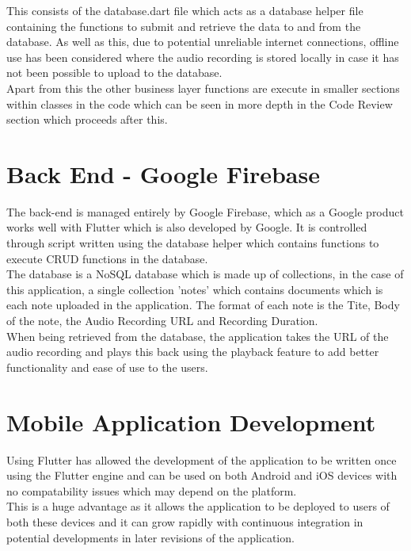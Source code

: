 \documentclass[oneside]{report}
\begin{document}
	This consists of the database.dart file which acts as a database helper file containing the functions to submit and retrieve the data to and from the database. As well as this, due to potential unreliable internet connections, offline use has been considered where the audio recording is stored locally in case it has not been possible to upload to the database. \\
	
	Apart from this the other business layer functions are execute in smaller sections within classes in the code which can be seen in more depth in the Code Review section which proceeds after this.

	\section{Back End - Google Firebase}
	The back-end is managed entirely by Google Firebase, which as a Google product works well with Flutter which is also developed by Google. It is controlled through script written using the database helper which contains functions to execute CRUD functions in the database.\\

The database is a NoSQL database which is made up of collections, in the case of this application, a single collection 'notes' which contains documents which is each note uploaded in the application. The format of each note is the Tite, Body of the note, the Audio Recording URL and Recording Duration.\\

When being retrieved from the database, the application takes the URL of the audio recording and plays this back using the playback feature to add better functionality and ease of use to the users.

	\section{Mobile Application Development}
	Using Flutter has allowed the development of the application to be written once using the Flutter engine and can be used on both Android and iOS devices with no compatability issues which may depend on the platform.\\

This is a huge advantage as it allows the application to be deployed to users of both these devices and it can grow rapidly with continuous integration in potential developments in later revisions of the application. \\
\end{document}
